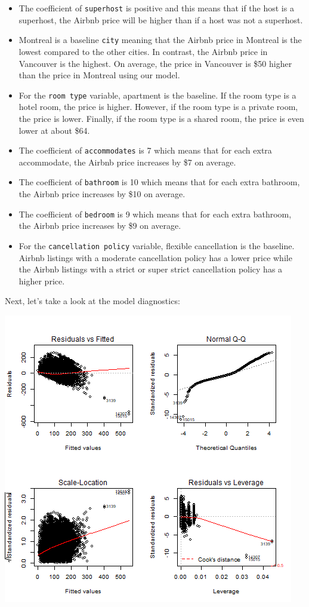 \documentclass[
]{article}
\providecommand{\tightlist}{%
  \setlength{\itemsep}{0pt}\setlength{\parskip}{0pt}}
\begin{document}
\begin{itemize}
\tightlist
\item
  The coefficient of \texttt{superhost} is positive and this means that
  if the host is a superhost, the Airbnb price will be higher than if a
  host was not a superhost.
\item
  Montreal is a baseline \texttt{city} meaning that the Airbnb price in
  Montreal is the lowest compared to the other cities. In contrast, the
  Airbnb price in Vancouver is the highest. On average, the price in
  Vancouver is \$50 higher than the price in Montreal using our model.\\
\item
  For the \texttt{room\ type} variable, apartment is the baseline. If
  the room type is a hotel room, the price is higher. However, if the
  room type is a private room, the price is lower. Finally, if the room
  type is a shared room, the price is even lower at about \$64.
\item
  The coefficient of \texttt{accommodates} is 7 which means that for
  each extra accommodate, the Airbnb price increases by \$7 on average.
\item
  The coefficient of \texttt{bathroom} is 10 which means that for each
  extra bathroom, the Airbnb price increases by \$10 on average.
\item
  The coefficient of \texttt{bedroom} is 9 which means that for each
  extra bathroom, the Airbnb price increases by \$9 on average.
\item
  For the \texttt{cancellation\ policy} variable, flexible cancellation
  is the baseline. Airbnb listings with a moderate cancellation policy
  has a lower price while the Airbnb listings with a strict or super
  strict cancellation policy has a higher price.
\end{itemize}

Next, let's take a look at the model diagnostics:

\includegraphics{../Images/Model_Diagnostics.png}
\end{document}
